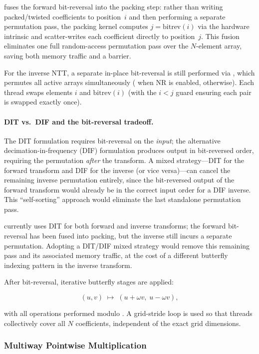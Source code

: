 \FractalShark{} fuses the forward bit-reversal into the packing step:
rather than writing packed/twisted coefficients to position~$i$ and then
performing a separate permutation pass, the packing kernel computes
$j = \mathrm{bitrev}(i)$ via the hardware  intrinsic
and scatter-writes each coefficient directly to position~$j$.
This fusion eliminates one full random-access permutation pass over the
$N$-element array, saving both memory traffic and a
 barrier.

For the inverse NTT, a separate in-place bit-reversal is still
performed via , which
permutes all active arrays simultaneously ( when NR is
enabled,  otherwise).  Each thread swaps
elements $i$ and $\mathrm{bitrev}(i)$ (with the $i < j$ guard ensuring
each pair is swapped exactly once).

\paragraph{DIT vs.\ DIF and the bit-reversal tradeoff.}
The DIT formulation requires bit-reversal on the \emph{input}; the
alternative decimation-in-frequency (DIF) formulation produces output in
bit-reversed order, requiring the permutation \emph{after} the
transform.  A mixed strategy---DIT for the forward transform and DIF for
the inverse (or vice versa)---can cancel the remaining inverse
permutation entirely, since the bit-reversed output of the forward
transform would already be in the correct input order for a DIF inverse.
This ``self-sorting'' approach would eliminate the last standalone
permutation pass.

\FractalShark{} currently uses DIT for both forward and inverse
transforms; the forward bit-reversal has been fused into packing, but
the inverse still incurs a separate permutation.  Adopting a DIT/DIF
mixed strategy would remove this remaining pass and its associated
memory traffic, at the cost of a different butterfly indexing pattern in
the inverse transform.

After bit-reversal, iterative butterfly stages are applied:

\[
(u, v) \;\mapsto\; (u + \omega v,\; u - \omega v),
\]

with all operations performed modulo . A grid-stride loop is
used so that threads collectively cover all $N$ coefficients, independent of the
exact grid dimensions.

\subsubsection{Multiway Pointwise Multiplication}

